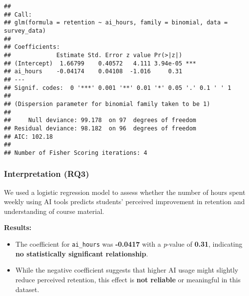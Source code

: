 \documentclass[
]{article}
\newenvironment{Shaded}{\begin{snugshade}}{\end{snugshade}}
\newcommand{\AttributeTok}[1]{\textcolor[rgb]{0.13,0.29,0.53}{#1}}
\newcommand{\CommentTok}[1]{\textcolor[rgb]{0.56,0.35,0.01}{\textit{#1}}}
\newcommand{\FunctionTok}[1]{\textcolor[rgb]{0.13,0.29,0.53}{\textbf{#1}}}
\newcommand{\NormalTok}[1]{#1}
\newcommand{\OtherTok}[1]{\textcolor[rgb]{0.56,0.35,0.01}{#1}}
\newcommand{\SpecialCharTok}[1]{\textcolor[rgb]{0.81,0.36,0.00}{\textbf{#1}}}
\providecommand{\tightlist}{%
  \setlength{\itemsep}{0pt}\setlength{\parskip}{0pt}}
\begin{document}
\begin{Shaded}
\end{Shaded}

\begin{verbatim}
## 
## Call:
## glm(formula = retention ~ ai_hours, family = binomial, data = survey_data)
## 
## Coefficients:
##             Estimate Std. Error z value Pr(>|z|)    
## (Intercept)  1.66799    0.40572   4.111 3.94e-05 ***
## ai_hours    -0.04174    0.04108  -1.016     0.31    
## ---
## Signif. codes:  0 '***' 0.001 '**' 0.01 '*' 0.05 '.' 0.1 ' ' 1
## 
## (Dispersion parameter for binomial family taken to be 1)
## 
##     Null deviance: 99.178  on 97  degrees of freedom
## Residual deviance: 98.182  on 96  degrees of freedom
## AIC: 102.18
## 
## Number of Fisher Scoring iterations: 4
\end{verbatim}

\subsubsection{Interpretation (RQ3)}\label{interpretation-rq3}

We used a logistic regression model to assess whether the number of
hours spent weekly using AI tools predicts students' perceived
improvement in retention and understanding of course material.

\textbf{Results:}

\begin{itemize}
\tightlist
\item
  The coefficient for \texttt{ai\_hours} was \textbf{-0.0417} with a
  \emph{p}-value of \textbf{0.31}, indicating \textbf{no statistically
  significant relationship}.
\item
  While the negative coefficient suggests that higher AI usage might
  slightly reduce perceived retention, this effect is \textbf{not
  reliable} or meaningful in this dataset.
\end{itemize}
\end{document}
